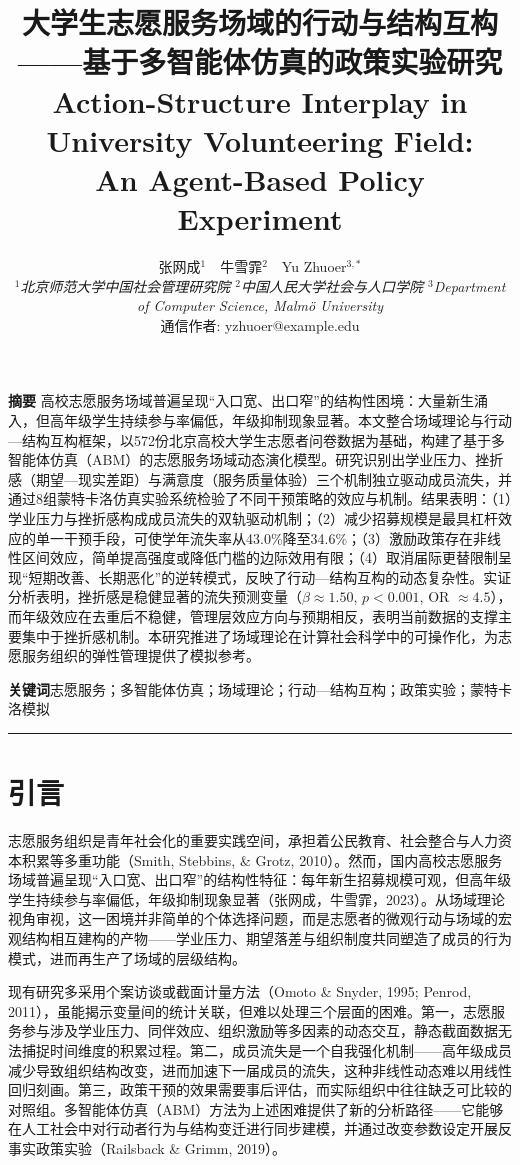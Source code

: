 \documentclass[12pt,a4paper]{article}
\title{\textbf{大学生志愿服务场域的行动与结构互构——基于多智能体仿真的政策实验研究}\\[0.5em]
\Large\rmfamily Action-Structure Interplay in University Volunteering Field:\\An Agent-Based Policy Experiment}
\author{
  张网成$^{1}$~~牛雪霏$^{2}$~~Yu Zhuoer$^{3,*}$\\[0.5em]
  \small 
  \nopagebreak
  {\it 
  $^1$北京师范大学中国社会管理研究院\qquad
  $^2$中国人民大学社会与人口学院\qquad
  $^{3}$Department of Computer Science, Malm\"o University
  }\\[0.3em]
  \small *通信作者: yzhuoer@example.edu
}
\date{}
\begin{document}
\maketitle
\thispagestyle{empty}

\vspace{-0.5em}
\textbf{摘要}\quad 
高校志愿服务场域普遍呈现“入口宽、出口窄”的结构性困境：大量新生涌入，但高年级学生持续参与率偏低，年级抑制现象显著。本文整合场域理论与行动—结构互构框架，以572份北京高校大学生志愿者问卷数据为基础，构建了基于多智能体仿真（ABM）的志愿服务场域动态演化模型。研究识别出学业压力、挫折感（期望—现实差距）与满意度（服务质量体验）三个机制独立驱动成员流失，并通过8组蒙特卡洛仿真实验系统检验了不同干预策略的效应与机制。结果表明：（1）学业压力与挫折感构成成员流失的双轨驱动机制；（2）减少招募规模是最具杠杆效应的单一干预手段，可使学年流失率从43.0\%降至34.6\%；（3）激励政策存在非线性区间效应，简单提高强度或降低门槛的边际效用有限；（4）取消届际更替限制呈现“短期改善、长期恶化”的逆转模式，反映了行动—结构互构的动态复杂性。实证分析表明，挫折感是稳健显著的流失预测变量（$\beta \approx 1.50$, $p < 0.001$, OR $\approx 4.5$），而年级效应在去重后不稳健，管理层效应方向与预期相反，表明当前数据的支撑主要集中于挫折感机制。本研究推进了场域理论在计算社会科学中的可操作化，为志愿服务组织的弹性管理提供了模拟参考。

\vspace{0.3em}
\textbf{关键词}\quad 志愿服务；多智能体仿真；场域理论；行动—结构互构；政策实验；蒙特卡洛模拟

\vspace{1em}
\hrule
\vspace{1em}

\section{引言}

志愿服务组织是青年社会化的重要实践空间，承担着公民教育、社会整合与人力资本积累等多重功能（Smith, Stebbins, \& Grotz, 2010）。然而，国内高校志愿服务场域普遍呈现“入口宽、出口窄”的结构性特征：每年新生招募规模可观，但高年级学生持续参与率偏低，年级抑制现象显著（张网成，牛雪霏，2023）。从场域理论视角审视，这一困境并非简单的个体选择问题，而是志愿者的微观行动与场域的宏观结构相互建构的产物——学业压力、期望落差与组织制度共同塑造了成员的行为模式，进而再生产了场域的层级结构。

现有研究多采用个案访谈或截面计量方法（Omoto \& Snyder, 1995; Penrod, 2011），虽能揭示变量间的统计关联，但难以处理三个层面的困难。第一，志愿服务参与涉及学业压力、同伴效应、组织激励等多因素的动态交互，静态截面数据无法捕捉时间维度的积累过程。第二，成员流失是一个自我强化机制——高年级成员减少导致组织结构改变，进而加速下一届成员的流失，这种非线性动态难以用线性回归刻画。第三，政策干预的效果需要事后评估，而实际组织中往往缺乏可比较的对照组。多智能体仿真（ABM）方法为上述困难提供了新的分析路径——它能够在人工社会中对行动者行为与结构变迁进行同步建模，并通过改变参数设定开展反事实政策实验（Railsback \& Grimm, 2019）。
\end{document}
